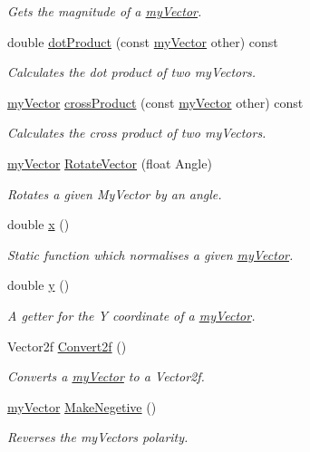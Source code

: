 \begin{DoxyCompactItemize}
\begin{DoxyCompactList}\small\item\em Gets the magnitude of a \hyperlink{classmy_vector}{my\+Vector}. \end{DoxyCompactList}\item 
double \hyperlink{classmy_vector_af43d29d51639072515cad23ef7415786}{dot\+Product} (const \hyperlink{classmy_vector}{my\+Vector} other) const 
\begin{DoxyCompactList}\small\item\em Calculates the dot product of two my\+Vectors. \end{DoxyCompactList}\item 
\hyperlink{classmy_vector}{my\+Vector} \hyperlink{classmy_vector_af05be0fcb82238606e624b97eef10990}{cross\+Product} (const \hyperlink{classmy_vector}{my\+Vector} other) const 
\begin{DoxyCompactList}\small\item\em Calculates the cross product of two my\+Vectors. \end{DoxyCompactList}\item 
\hyperlink{classmy_vector}{my\+Vector} \hyperlink{classmy_vector_a417556fbd4eda0e98ae1b76973bb75b4}{Rotate\+Vector} (float Angle)
\begin{DoxyCompactList}\small\item\em Rotates a given My\+Vector by an angle. \end{DoxyCompactList}\item 
double \hyperlink{classmy_vector_a240764ad5e79de7a6ce9e950bc531682}{x} ()
\begin{DoxyCompactList}\small\item\em Static function which normalises a given \hyperlink{classmy_vector}{my\+Vector}. \end{DoxyCompactList}\item 
double \hyperlink{classmy_vector_a940c23ee317384a6fd3b4588986ad3cb}{y} ()
\begin{DoxyCompactList}\small\item\em A getter for the Y coordinate of a \hyperlink{classmy_vector}{my\+Vector}. \end{DoxyCompactList}\item 
Vector2f \hyperlink{classmy_vector_a2a99754a40661435447dd17138e8f63a}{Convert2f} ()
\begin{DoxyCompactList}\small\item\em Converts a \hyperlink{classmy_vector}{my\+Vector} to a Vector2f. \end{DoxyCompactList}\item 
\hyperlink{classmy_vector}{my\+Vector} \hyperlink{classmy_vector_a6d039a25169b58a8164f8f979d8b315b}{Make\+Negetive} ()
\begin{DoxyCompactList}\small\item\em Reverses the my\+Vectors polarity. \end{DoxyCompactList}\end{DoxyCompactItemize}
